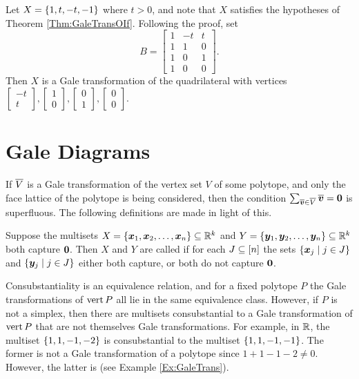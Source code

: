 \begin{Example}\label{Ex:GaleTrans}
    Let \(X=\left\{1,t,-t,-1\right\}\) where \(t>0\), and note that \(X\) satisfies the hypotheses of Theorem \ref{Thm:GaleTransOIf}.  Following the proof, set
        \[
            B=
                \begin{bmatrix}
                    1   &-t &t\\
                    1   &1  &0\\
                    1   &0  &1\\
                    1   &0  &0
                \end{bmatrix}.
        \]
    Then \(X\) is a Gale transformation of the quadrilateral with vertices \(\begin{bmatrix}-t\\ t\end{bmatrix},\begin{bmatrix}1\\ 0\end{bmatrix},\begin{bmatrix}0\\ 1\end{bmatrix},\begin{bmatrix}0\\ 0\end{bmatrix}\).
\end{Example}

\section{Gale Diagrams}
If \(\overline{V}\) is a Gale transformation of the vertex set \(V\) of some polytope, and only the face lattice of the polytope is being considered, then the condition \(\sum_{\overline{\bm{v}}\in\overline{V}}\overline{\bm{v}}=\bm{0}\) is superfluous.  The following definitions are made in light of this.

\begin{Definition}
    Suppose the multisets \(X=\left\{\bm{x}_1, \bm{x}_2,\dotsc,\bm{x}_n\right\}\subseteq\mathbb{R}^{k}\) and \(Y=\left\{\bm{y}_1,\bm{y}_2,\dotsc,\bm{y}_n\right\}\subseteq\mathbb{R}^{k}\) both capture \(\bm{0}\).  Then \(X\) and \(Y\) are called  if for each \(J\subseteq\left[n\right]\) the sets \(\setb{\ve x_j}{j\in J}\) and \(\setb{\ve y_j}{j\in J}\) either both capture, or both do not capture \(\bm{0}\).
\end{Definition}

Consubstantiality is an equivalence relation, and for a fixed polytope \(P\) the Gale transformations of \(\operatorname{vert} P\) all lie in the same equivalence class.  However, if \(P\) is not a simplex, then there are multisets consubstantial to a Gale transformation of \(\operatorname{vert} P\) that are not themselves Gale transformations.  For example, in \(\mathbb{R}\), the multiset \(\left\{1,1,-1,-2\right\}\) is consubstantial to the multiset \(\left\{1,1,-1,-1\right\}\).  The former is not a Gale transformation of a polytope since \(1+1-1-2\ne0\).  However, the latter is (see Example \ref{Ex:GaleTrans}).

